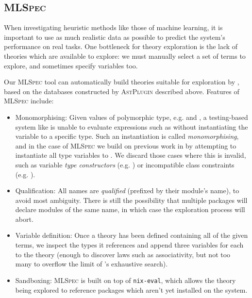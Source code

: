 \subsection{\textsc{MLSpec}}
\label{sec:mlspec}

When investigating heuristic methods like those of machine learning, it is important to use as much realistic data as possible to predict the system's performance on real tasks. One bottleneck for theory exploration is the lack of theories which are available to explore: we must manually select a set of terms to explore, and sometimes specify variables too.

Our \textsc{MLSpec} tool can automatically build theories suitable for exploration by \qspec{}, based on the databases constructed by \textsc{AstPlugin} described above. Features of \textsc{MLSpec} include:

\begin{itemize}
  \item{Monomorphising}: Given values of polymorphic type, e.g.  and , a testing-based system like \qspec{} is unable to evaluate expressions such as  without instantiating the variable  to a specific type. Such an instantiation is called \emph{monomorphising}, and in the case of \textsc{MLSpec} we build on previous work in \qcheck{} by attempting to instantiate all type variables to . We discard those cases where this is invalid, such as variable \emph{type constructors} (e.g. ) or incompatible class constraints (e.g. ).

  \item{Qualification}: All names are \emph{qualified} (prefixed by their module's name), to avoid most ambiguity. There is still the possibility that multiple packages will declare modules of the same name, in which case the exploration process will abort.

  \item{Variable definition}: Once a \qspec{} theory has been defined containing all of the given terms, we inspect the types it references and append three variables for each to the theory (enough to discover laws such as associativity, but not too many to overflow the limit of \qspec{}'s exhaustive search).

  \item{Sandboxing}: \textsc{MLSpec} is built on top of \texttt{nix-eval}, which allows the theory being explored to reference packages which aren't yet installed on the system.

\end{itemize}

